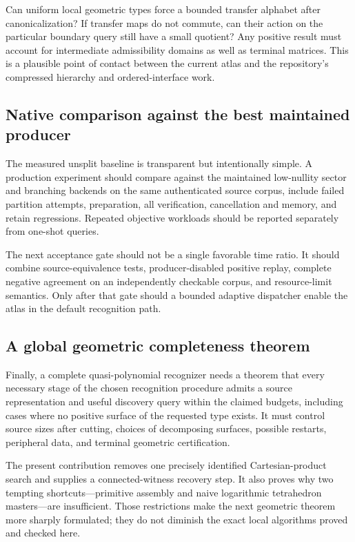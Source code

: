 \documentclass[11pt,a4paper]{article}
\theoremstyle{definition}
\theoremstyle{remark}
\begin{document}
Can uniform local geometric types force a bounded transfer alphabet after canonicalization? If transfer maps do not commute, can their action on the particular boundary query still have a small quotient? Any positive result must account for intermediate admissibility domains as well as terminal matrices. This is a plausible point of contact between the current atlas and the repository's compressed hierarchy and ordered-interface work.

\subsection{Native comparison against the best maintained producer}
The measured unsplit baseline is transparent but intentionally simple. A production experiment should compare against the maintained low-nullity sector and branching backends on the same authenticated source corpus, include failed partition attempts, preparation, all verification, cancellation and memory, and retain regressions. Repeated objective workloads should be reported separately from one-shot queries.

The next acceptance gate should not be a single favorable time ratio. It should combine source-equivalence tests, producer-disabled positive replay, complete negative agreement on an independently checkable corpus, and resource-limit semantics. Only after that gate should a bounded adaptive dispatcher enable the atlas in the default recognition path.

\subsection{A global geometric completeness theorem}
Finally, a complete quasi-polynomial recognizer needs a theorem that every necessary stage of the chosen recognition procedure admits a source representation and useful discovery query within the claimed budgets, including cases where no positive surface of the requested type exists. It must control source sizes after cutting, choices of decomposing surfaces, possible restarts, peripheral data, and terminal geometric certification.

The present contribution removes one precisely identified Cartesian-product search and supplies a connected-witness recovery step. It also proves why two tempting shortcuts---primitive assembly and naive logarithmic tetrahedron masters---are insufficient. Those restrictions make the next geometric theorem more sharply formulated; they do not diminish the exact local algorithms proved and checked here.
\end{document}
